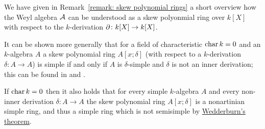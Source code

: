 \begin{remark}
  We have given in Remark~\ref{remark: skew polynomial rings} a short overview how the Weyl algebra $\operatorname{\mathcal{A}}$ can be understood as a skew polyonmial ring over $k[X]$ with respect to the $k$-derivation $\partial \colon k[X] \to k[X]$.
  
  It can be shown more generally that for a field of characteristic $\operatorname{char} k = 0$ and an $k$-algebra $A$ a skew polynomial ring $A[x;\delta]$ (with respect to a $k$-derivation $\delta \colon A \to A$) is simple if and only if $A$ is $\delta$-simple and $\delta$ is not an inner derivation;
  this can be found in \cite[Theorem~3.15]{Lam1991First} and \cite[Proposition~2.1]{NoncommutativeNoetherian}.
  
  If $\operatorname{char} k = 0$ then it also holds that for every simple $k$-algebra $A$ and every non-inner derivation $\delta \colon A \to A$ the skew polynomial ring $A[x;\delta]$ is a nonartinian simple ring, and thus a simple ring which is not semisimple by \hyperref[theorem: wedderburns theorem]{Wedderburn’s theorem}.
\end{remark}


